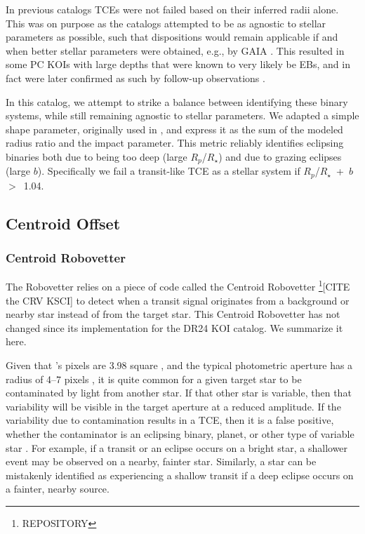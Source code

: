 In previous catalogs \citep{Rowe2015cat,Mullally2015cat,Coughlin2016} TCEs were not failed based on their inferred radii alone. This was on purpose as the catalogs attempted to be as agnostic to stellar parameters as possible, such that dispositions would remain applicable if and when better stellar parameters were obtained, e.g., by GAIA \citep{Cacciari2009,Mignard2005}. This resulted in some PC KOIs with large depths that were known to very likely be EBs, and in fact were later confirmed as such by follow-up observations \citep{Santerne2016}.

In this catalog, we attempt to strike a balance between identifying these binary systems, while still remaining agnostic to stellar parameters. We adapted a simple shape parameter, originally used in \citet{Batalha2013}, and express it as the sum of the modeled radius ratio and the impact parameter. This metric reliably identifies eclipsing binaries both due to being too deep (large $R_{p}$/$R_{\star}$) and due to grazing eclipses (large $b$). Specifically we fail a transit-like TCE as a stellar system if $R_{p}$/$R_{\star}$~+~$b$~$>$~1.04.



\subsection{Centroid Offset}
\subsubsection{Centroid Robovetter}
\label{s:centroidrv}
The Robovetter relies on a piece of code called the Centroid Robovetter \footnote{REPOSITORY}\citep{Mullally2017}[CITE the CRV KSCI] to detect when a transit signal originates from a background or nearby star instead of from the target star. This Centroid Robovetter has not changed since its implementation for the DR24 KOI catalog. We summarize it here. 

Given that \kepler 's pixels are 3.98\arcsec{} square \citep{Koch2010}, and the typical photometric aperture has a radius of 4--7 pixels \citep{Bryson2010b}, it is quite common for a given target star to be contaminated by light from another star. If that other star is variable, then that variability will be visible in the target aperture at a reduced amplitude. If the variability due to contamination results in a TCE, then it is a false positive, whether the contaminator is an eclipsing binary, planet, or other type of variable star \citep{Bryson2013}. For example, if a transit or an eclipse occurs on a bright star, a shallower event may be observed on a nearby, fainter star. Similarly, a star can be mistakenly identified as experiencing a shallow transit if a deep eclipse occurs on a fainter, nearby source.

